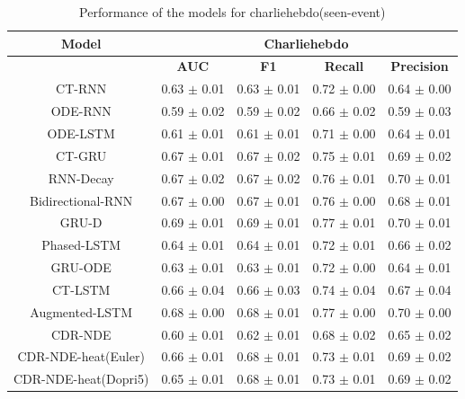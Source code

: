\documentclass{article} %
\begin{document}
\begin{table}
        \begin{center}
          \begin{tabular}{|c|c|c|c|c|}
                        \hline
                        {\small \textbf{Model}}  & \multicolumn{4}{c|}{\textbf{Charliehebdo} } \\
                        \hline
                         & \textbf{AUC }& \textbf{F1} & \textbf{Recall} & \textbf{Precision} \\
                         \hline
                        CT-RNN & 0.63 $\pm$ 0.01 & 0.63 $\pm$ 0.01 & 0.72 $\pm$ 0.00 & 0.64 $\pm$ 0.00 \\
                        ODE-RNN & 0.59 $\pm$ 0.02 & 0.59 $\pm$ 0.02 & 0.66 $\pm$ 0.02 & 0.59 $\pm$ 0.03 \\
                        ODE-LSTM & 0.61 $\pm$ 0.01 & 0.61 $\pm$ 0.01 & 0.71 $\pm$ 0.00 & 0.64 $\pm$ 0.01 \\
                        CT-GRU & 0.67 $\pm$ 0.01 & 0.67 $\pm$ 0.02 & 0.75 $\pm$ 0.01 & 0.69 $\pm$ 0.02 \\
                        RNN-Decay & 0.67 $\pm$ 0.02 & 0.67 $\pm$ 0.02 & 0.76 $\pm$ 0.01 & 0.70 $\pm$ 0.01 \\
                        Bidirectional-RNN & 0.67 $\pm$ 0.00 & 0.67 $\pm$ 0.01 & 0.76 $\pm$ 0.00 & 0.68 $\pm$ 0.01 \\
                        GRU-D & 0.69 $\pm$ 0.01 & 0.69 $\pm$ 0.01 & 0.77 $\pm$ 0.01 & 0.70 $\pm$ 0.01 \\
                        Phased-LSTM & 0.64 $\pm$ 0.01 & 0.64 $\pm$ 0.01 & 0.72 $\pm$ 0.01 & 0.66 $\pm$ 0.02 \\
                        GRU-ODE & 0.63 $\pm$ 0.01 & 0.63 $\pm$ 0.01 & 0.72 $\pm$ 0.00 & 0.64 $\pm$ 0.01 \\
                        CT-LSTM & 0.66 $\pm$ 0.04 & 0.66 $\pm$ 0.03 & 0.74 $\pm$ 0.04 & 0.67 $\pm$ 0.04 \\
                        Augmented-LSTM & 0.68 $\pm$ 0.00 & 0.68 $\pm$ 0.01 & 0.77 $\pm$ 0.00 & 0.70 $\pm$ 0.00 \\
                        \hline
                        CDR-NDE & 0.60 $\pm$ 0.01 & 0.62 $\pm$ 0.01 & 0.68 $\pm$ 0.02 & 0.65 $\pm$ 0.02 \\ 
CDR-NDE-heat(Euler) & 0.66 $\pm$ 0.01 & 0.68 $\pm$ 0.01 & 0.73 $\pm$ 0.01 & 0.69 $\pm$ 0.02 \\ 
CDR-NDE-heat(Dopri5) & 0.65 $\pm$ 0.01 & 0.68 $\pm$ 0.01 & 0.73 $\pm$ 0.01 & 0.69 $\pm$ 0.02 \\ \hline 
                \end{tabular}
        \end{center}
        \caption{Performance of the models for charliehebdo(seen-event)}
        \label{tab:Charliehebdo}
\end{table}
\end{document}
